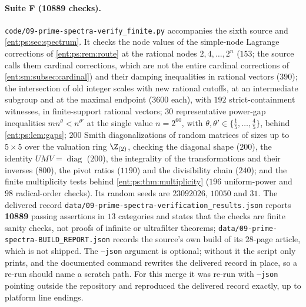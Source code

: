 \documentclass[11pt]{article}
\theoremstyle{plain}
\theoremstyle{plain}
\theoremstyle{plain}
\theoremstyle{definition}
\theoremstyle{definition}
\theoremstyle{definition}
\theoremstyle{definition}
\theoremstyle{remark}
\begin{document}
\paragraph{Suite F (10889 checks).}
\texttt{code/09-prime-spectra-verify\_finite.py} accompanies the sixth source
and \cref{ent:ps:sec:spectrum}. It checks the node values of the
simple-node Lagrange corrections of \cref{ent:ps:rem:route} at the rational
nodes $2,4,\ldots,2^n$ ($153$; the source calls them cardinal corrections,
which are not the entire cardinal corrections of
\cref{ent:sm:subsec:cardinal}) and their damping inequalities in rational
vectors ($390$); the
intersection of old integer scales with new rational cutoffs, at an
intermediate subgroup and at the maximal endpoint ($3600$ each), with $192$
strict-containment witnesses, in finite-support rational vectors; $30$
representative power-gap inequalities $mn^{\theta}<n^{\theta'}$ at the single
value $n=2^{60}$, with $\theta,\theta'\in\{\tfrac15,\ldots,\tfrac45\}$, behind
\cref{ent:ps:lem:gaps}; $200$ Smith diagonalizations of random matrices of
sizes up to $5\times5$ over the valuation ring $\Z_{(2)}$, checking the
diagonal shape ($200$), the identity $UMV=\operatorname{diag}$ ($200$), the
integrality of the transformations and their inverses ($800$), the pivot
ratios ($1190$) and the divisibility chain ($240$); and the finite
multiplicity tests behind \cref{ent:ps:thm:multiplicity} ($196$ uniform-power
and $98$ radical-order checks). Its random seeds are $23092026$, $10050$ and
$31$. The delivered record \texttt{data/09-prime-spectra-verification\_results.json}
reports \textbf{10889} passing assertions in $13$ categories and states that
the checks are finite sanity checks, not proofs of infinite or ultrafilter
theorems; \texttt{data/09-prime-spectra-BUILD\_REPORT.json} records the
source's own build of its $28$-page article, which is not shipped. The
\texttt{--json} argument is optional; without it the script only prints, and
the documented command rewrites the delivered record in place, so a re-run
should name a scratch path. For this merge it was re-run with \texttt{--json}
pointing outside the repository and reproduced the delivered record exactly,
up to platform line endings.
\end{document}
